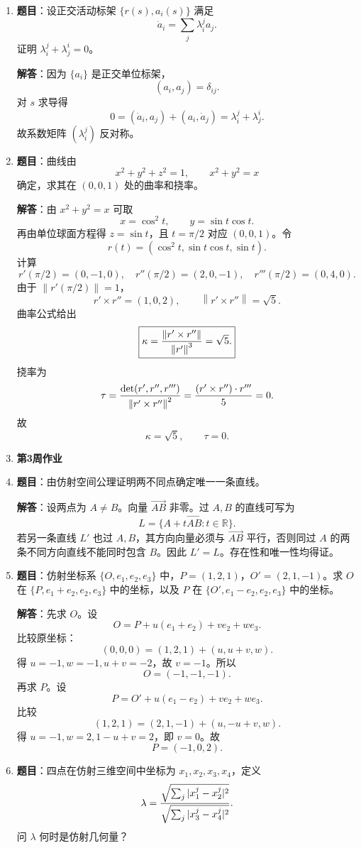 \documentclass[UTF8,12pt,a4paper]{ctexart}
\newcommand{\R}{\mathbb R}
\newcommand{\norm}[1]{\left\lVert #1\right\rVert}
\newcommand{\inner}[2]{\left(#1,#2\right)}
\newcommand{\homeworkweek}[1]{%
  \item[]\vspace{0.35em}\noindent\textbf{\large #1}\vspace{0.15em}
}
\begin{document}
\begin{enumerate}
\item \textbf{题目}：设正交活动标架 $\{r(s),a_i(s)\}$ 满足
\[
\dot a_i=\sum_j \lambda_i^j a_j.
\]
证明 $\lambda_i^j+\lambda_j^i=0$。

\textbf{解答}：因为 $\{a_i\}$ 是正交单位标架，
\[
\inner{a_i}{a_j}=\delta_{ij}.
\]
对 $s$ 求导得
\[
0=\inner{\dot a_i}{a_j}+\inner{a_i}{\dot a_j}
=\lambda_i^j+\lambda_j^i.
\]
故系数矩阵 $(\lambda_i^j)$ 反对称。

\item \textbf{题目}：曲线由
\[
x^2+y^2+z^2=1,\qquad x^2+y^2=x
\]
确定，求其在 $(0,0,1)$ 处的曲率和挠率。

\textbf{解答}：由 $x^2+y^2=x$ 可取
\[
x=\cos^2t,\qquad y=\sin t\cos t.
\]
再由单位球面方程得 $z=\sin t$，且 $t=\pi/2$ 对应 $(0,0,1)$。令
\[
r(t)=(\cos^2t,\sin t\cos t,\sin t).
\]
计算
\[
r'(\pi/2)=(0,-1,0),\quad
r''(\pi/2)=(2,0,-1),\quad
r'''(\pi/2)=(0,4,0).
\]
由于 $\norm{r'(\pi/2)}=1$，
\[
r'\times r''=(1,0,2),\qquad \norm{r'\times r''}=\sqrt5.
\]
曲率公式给出
\[
\boxed{\kappa={\norm{r'\times r''}\over\norm{r'}^3}=\sqrt5.}
\]
挠率为
\[
\tau={\det(r',r'',r''')\over\norm{r'\times r''}^2}
={(r'\times r'')\cdot r'''\over 5}=0.
\]
故
\[
\boxed{\kappa=\sqrt5,\qquad \tau=0.}
\]

\homeworkweek{第3周作业}
\item \textbf{题目}：由仿射空间公理证明两不同点确定唯一一条直线。

\textbf{解答}：设两点为 $A\ne B$。向量 $\overrightarrow{AB}$ 非零。过 $A,B$ 的直线可写为
\[
L=\{A+t\overrightarrow{AB}:t\in\R\}.
\]
若另一条直线 $L'$ 也过 $A,B$，其方向向量必须与 $\overrightarrow{AB}$ 平行，否则同过 $A$ 的两条不同方向直线不能同时包含 $B$。因此 $L'=L$。存在性和唯一性均得证。

\item \textbf{题目}：仿射坐标系 $\{O,e_1,e_2,e_3\}$ 中，$P=(1,2,1)$，$O'=(2,1,-1)$。求 $O$ 在 $\{P,e_1+e_2,e_2,e_3\}$ 中的坐标，以及 $P$ 在 $\{O',e_1-e_2,e_2,e_3\}$ 中的坐标。

\textbf{解答}：先求 $O$。设
\[
O=P+u(e_1+e_2)+v e_2+w e_3.
\]
比较原坐标：
\[
(0,0,0)=(1,2,1)+(u,u+v,w).
\]
得 $u=-1,w=-1,u+v=-2$，故 $v=-1$。所以
\[
\boxed{O=(-1,-1,-1).}
\]
再求 $P$。设
\[
P=O'+u(e_1-e_2)+v e_2+w e_3.
\]
比较
\[
(1,2,1)=(2,1,-1)+(u,-u+v,w).
\]
得 $u=-1,w=2,1-u+v=2$，即 $v=0$。故
\[
\boxed{P=(-1,0,2).}
\]

\item \textbf{题目}：四点在仿射三维空间中坐标为 $x_1,x_2,x_3,x_4$，定义
\[
\lambda={\sqrt{\sum_j|x_1^j-x_2^j|^2}\over
\sqrt{\sum_j|x_3^j-x_4^j|^2}}.
\]
问 $\lambda$ 何时是仿射几何量？


\end{enumerate}
\end{document}
